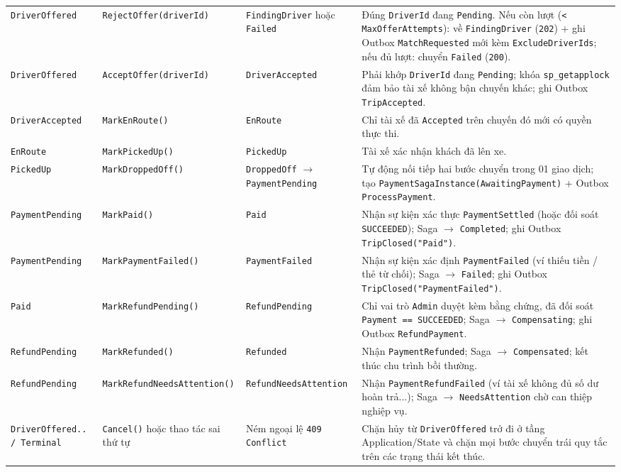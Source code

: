 \documentclass[12pt,a4paper]{article}
\newcommand{\ab}{\allowbreak}
\begin{document}
{\begin{longtable}{L{2.6cm} L{2.8cm} L{2.8cm} L{6.4cm}}
\texttt{DriverOffered} & \texttt{RejectOffer(\ab driverId)} & \texttt{FindingDriver} \newline hoặc \texttt{Failed} & Đúng \texttt{DriverId} đang \texttt{Pending}. Nếu còn lượt (\texttt{< MaxOfferAttempts}): về \texttt{FindingDriver} (\texttt{202}) + ghi Outbox \texttt{MatchRequested} mới kèm \texttt{ExcludeDriverIds}; nếu đủ lượt: chuyển \texttt{Failed} (\texttt{200}). \\
\texttt{DriverOffered} & \texttt{AcceptOffer(\ab driverId)} & \texttt{DriverAccepted} & Phải khớp \texttt{DriverId} đang \texttt{Pending}; khóa \texttt{sp\_getapplock} đảm bảo tài xế không bận chuyến khác; ghi Outbox \texttt{TripAccepted}. \\
\texttt{DriverAccepted} & \texttt{MarkEnRoute()} & \texttt{EnRoute} & Chỉ tài xế đã \texttt{Accepted} trên chuyến đó mới có quyền thực thi. \\
\texttt{EnRoute} & \texttt{MarkPickedUp()} & \texttt{PickedUp} & Tài xế xác nhận khách đã lên xe. \\
\texttt{PickedUp} & \texttt{MarkDroppedOff()} & \texttt{DroppedOff} $\rightarrow$ \texttt{PaymentPending} & Tự động nối tiếp hai bước chuyển trong 01 giao dịch; tạo \texttt{PaymentSaga\ab Instance(\ab AwaitingPayment)} + Outbox \texttt{ProcessPayment}. \\
\texttt{PaymentPending} & \texttt{MarkPaid()} & \texttt{Paid} & Nhận sự kiện xác thực \texttt{PaymentSettled} (hoặc đối soát \texttt{SUCCEEDED}); Saga $\rightarrow$ \texttt{Completed}; ghi Outbox \texttt{TripClosed("Paid")}. \\
\texttt{PaymentPending} & \texttt{MarkPayment\ab Failed()} & \texttt{PaymentFailed} & Nhận sự kiện xác định \texttt{PaymentFailed} (ví thiếu tiền / thẻ từ chối); Saga $\rightarrow$ \texttt{Failed}; ghi Outbox \texttt{TripClosed("PaymentFailed")}. \\
\texttt{Paid} & \texttt{MarkRefund\ab Pending()} & \texttt{RefundPending} & Chỉ vai trò \texttt{Admin} duyệt kèm bằng chứng, đã đối soát \texttt{Payment == SUCCEEDED}; Saga $\rightarrow$ \texttt{Compensating}; ghi Outbox \texttt{RefundPayment}. \\
\texttt{RefundPending} & \texttt{MarkRefunded()} & \texttt{Refunded} & Nhận \texttt{PaymentRefunded}; Saga $\rightarrow$ \texttt{Compensated}; kết thúc chu trình bồi thường. \\
\texttt{RefundPending} & \texttt{MarkRefundNeeds\ab Attention()} & \texttt{RefundNeeds\ab Attention} & Nhận \texttt{PaymentRefundFailed} (ví tài xế không đủ số dư hoàn trả...); Saga $\rightarrow$ \texttt{NeedsAttention} chờ can thiệp nghiệp vụ. \\
\texttt{DriverOffered.. / Terminal} & \texttt{Cancel()} hoặc thao tác sai thứ tự & Ném ngoại lệ \texttt{409 Conflict} & Chặn hủy từ \texttt{DriverOffered} trở đi ở tầng Application/State và chặn mọi bước chuyển trái quy tắc trên các trạng thái kết thúc. \\
\end{longtable}
\renewcommand{\arraystretch}{1.0}
}
\end{document}
